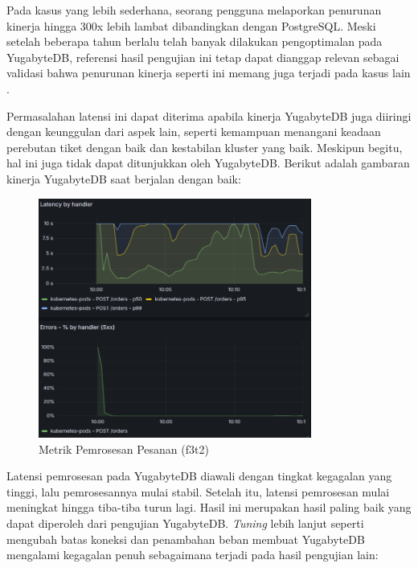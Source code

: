 Pada kasus yang lebih sederhana, seorang pengguna melaporkan penurunan kinerja hingga 300x lebih lambat dibandingkan dengan PostgreSQL. Meski setelah beberapa tahun berlalu telah banyak dilakukan pengoptimalan pada YugabyteDB, referensi hasil pengujian ini tetap dapat dianggap relevan sebagai validasi bahwa penurunan kinerja seperti ini memang juga terjadi pada kasus lain \parencite{yugabyteIssuePerformance}.

Permasalahan latensi ini dapat diterima apabila kinerja YugabyteDB juga diiringi dengan keunggulan dari aspek lain, seperti kemampuan menangani keadaan perebutan tiket dengan baik dan kestabilan kluster yang baik. Meskipun begitu, hal ini juga tidak dapat ditunjukkan oleh YugabyteDB. Berikut adalah gambaran kinerja YugabyteDB saat berjalan dengan baik:

\begin{figure}[htbp]
    \centering
    \includegraphics[width=0.8\textwidth]{resources/chapter-4/latensi-yugabyte-success.png}
    \caption{Metrik Pemrosesan Pesanan (f3t2)}
    \label{fig:metrics-f3t1}
\end{figure}

Latensi pemrosesan pada YugabyteDB diawali dengan tingkat kegagalan yang tinggi, lalu pemrosesannya mulai stabil. Setelah itu, latensi pemrosesan mulai meningkat hingga tiba-tiba turun lagi. Hasil ini merupakan hasil paling baik yang dapat diperoleh dari pengujian YugabyteDB. \textit{Tuning} lebih lanjut seperti mengubah batas koneksi dan penambahan beban membuat YugabyteDB mengalami kegagalan penuh sebagaimana terjadi pada hasil pengujian lain:

\pagebreak

